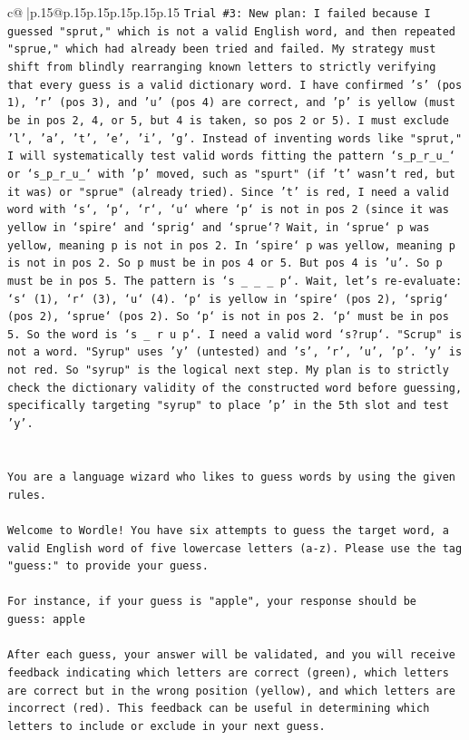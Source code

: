 \documentclass{article}
\begin{document}
{\begin{supertabular}{c@{$\;$}|p{.15\linewidth}@{}p{.15\linewidth}p{.15\linewidth}p{.15\linewidth}p{.15\linewidth}p{.15\linewidth}}
{{{\texttt{Trial \#3: New plan: I failed because I guessed "sprut," which is not a valid English word, and then repeated "sprue," which had already been tried and failed. My strategy must shift from blindly rearranging known letters to strictly verifying that every guess is a valid dictionary word. I have confirmed 's' (pos 1), 'r' (pos 3), and 'u' (pos 4) are correct, and 'p' is yellow (must be in pos 2, 4, or 5, but 4 is taken, so pos 2 or 5). I must exclude 'l', 'a', 't', 'e', 'i', 'g'. Instead of inventing words like "sprut," I will systematically test valid words fitting the pattern `s\_p\_r\_u\_` or `s\_p\_r\_u\_` with 'p' moved, such as "spurt" (if 't' wasn't red, but it was) or "sprue" (already tried). Since 't' is red, I need a valid word with `s`, `p`, `r`, `u` where `p` is not in pos 2 (since it was yellow in `spire` and `sprig` and `sprue`? Wait, in `sprue` p was yellow, meaning p is not in pos 2. In `spire` p was yellow, meaning p is not in pos 2. So p must be in pos 4 or 5. But pos 4 is 'u'. So p must be in pos 5. The pattern is `s \_ \_ \_ p`. Wait, let's re{-}evaluate: `s` (1), `r` (3), `u` (4). `p` is yellow in `spire` (pos 2), `sprig` (pos 2), `sprue` (pos 2). So `p` is not in pos 2. `p` must be in pos 5. So the word is `s \_ r u p`. I need a valid word `s?rup`. "Scrup" is not a word. "Syrup" uses 'y' (untested) and 's', 'r', 'u', 'p'. 'y' is not red. So "syrup" is the logical next step. My plan is to strictly check the dictionary validity of the constructed word before guessing, specifically targeting "syrup" to place 'p' in the 5th slot and test 'y'.} \\
\\ 
\\ 
\texttt{You are a language wizard who likes to guess words by using the given rules.} \\
\\ 
\texttt{Welcome to Wordle! You have six attempts to guess the target word, a valid English word of five lowercase letters (a{-}z). Please use the tag "guess:" to provide your guess.} \\
\\ 
\texttt{For instance, if your guess is "apple", your response should be} \\
\texttt{guess: apple} \\
\\ 
\texttt{After each guess, your answer will be validated, and you will receive feedback indicating which letters are correct (green), which letters are correct but in the wrong position (yellow), and which letters are incorrect (red). This feedback can be useful in determining which letters to include or exclude in your next guess.} \\
}}}
\end{supertabular}}
\end{document}
